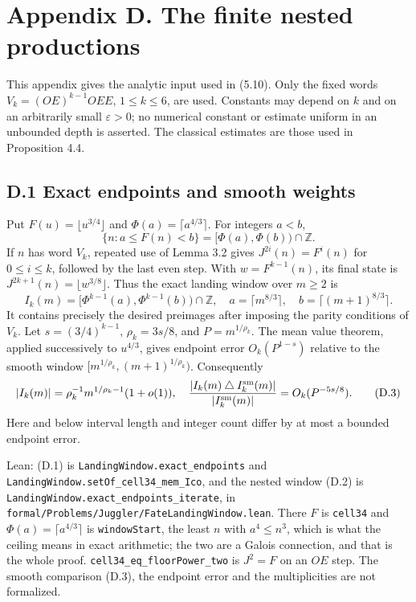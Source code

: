 \documentclass[11pt,a4paper]{article}
\begin{document}
\section{Appendix D. The finite nested
productions}\label{appendix-d.-the-finite-nested-productions}

This appendix gives the analytic input used in (5.10). Only the fixed
words \(V_k=(OE)^{k-1}OEE\), \(1\le k\le6\), are used. Constants may
depend on \(k\) and on an arbitrarily small \(\varepsilon>0\); no
numerical constant or estimate uniform in an unbounded depth is
asserted. The classical estimates are those used in Proposition 4.4.

\subsection{D.1 Exact endpoints and smooth
weights}\label{d.1-exact-endpoints-and-smooth-weights}

Put \(F(u)=\lfloor u^{3/4}\rfloor\) and
\(\Phi(a)=\lceil a^{4/3}\rceil\). For integers \(a<b\), \[
\{n:a\le F(n)<b\}=[\Phi(a),\Phi(b))\cap\mathbb Z.
\tag{D.1}
\] If \(n\) has word \(V_k\), repeated use of Lemma 3.2 gives
\(J^{2i}(n)=F^i(n)\) for \(0\le i\le k\), followed by the last even
step. With \(w=F^{k-1}(n)\), its final state is
\(J^{2k+1}(n)=\lfloor w^{3/8}\rfloor\). Thus the exact landing window
over \(m\ge2\) is \[
I_k(m)=[\Phi^{k-1}(a),\Phi^{k-1}(b))\cap\mathbb Z,
\quad a=\lceil m^{8/3}\rceil,\quad b=\lceil(m+1)^{8/3}\rceil.
\tag{D.2}
\] It contains precisely the desired preimages after imposing the parity
conditions of \(V_k\). Let \(s=(3/4)^{k-1}\), \(\rho_k=3s/8\), and
\(P=m^{1/\rho_k}\). The mean value theorem, applied successively to
\(u^{4/3}\), gives endpoint error \(O_k(P^{1-s})\) relative to the
smooth window \([m^{1/\rho_k},(m+1)^{1/\rho_k})\). Consequently \[
|I_k(m)|=\rho_k^{-1}m^{1/\rho_k-1}(1+o(1)),
\quad
\frac{|I_k(m)\mathbin\triangle I_k^{\rm sm}(m)|}{|I_k^{\rm sm}(m)|}
 =O_k(P^{-5s/8}).
\tag{D.3}
\] Here and below interval length and integer count differ by at most a
bounded endpoint error.

Lean: (D.1) is \texttt{\nolinkurl{LandingWindow.exact_endpoints}} and
\texttt{\nolinkurl{LandingWindow.setOf_cell34_mem_Ico}}, and the nested
window (D.2) is
\texttt{\nolinkurl{LandingWindow.exact_endpoints_iterate}}, in
\texttt{\nolinkurl{formal/Problems/Juggler/FateLandingWindow.lean}}.
There \(F\) is \texttt{\nolinkurl{cell34}} and
\(\Phi(a)=\lceil a^{4/3}\rceil\) is \texttt{\nolinkurl{windowStart}},
the least \(n\) with \(a^4\le n^3\), which is what the ceiling means in
exact arithmetic; the two are a Galois connection, and that is the whole
proof. \texttt{\nolinkurl{cell34_eq_floorPower_two}} is \(J^2=F\) on an
\(OE\) step. The smooth comparison (D.3), the endpoint error and the
multiplicities are not formalized.
\end{document}
